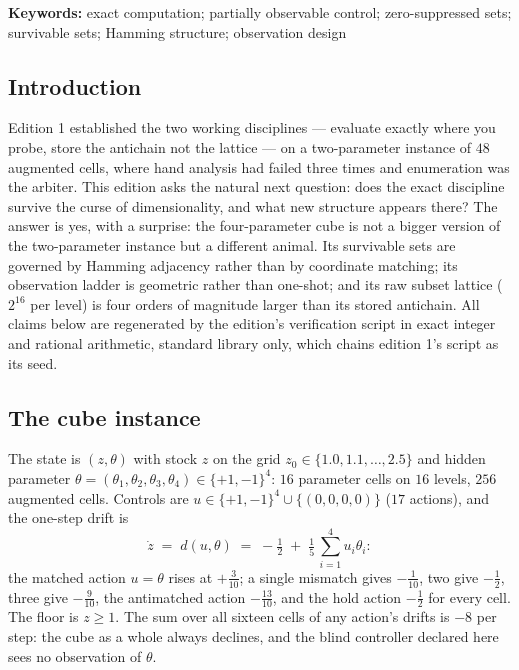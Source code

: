 \documentclass[10pt,twocolumn]{article}
\theoremstyle{plain}
\theoremstyle{definition}
\theoremstyle{remark}
\begin{document}
\textbf{Keywords:} exact computation; partially observable control;
zero-suppressed sets; survivable sets; Hamming structure; observation
design

\subsection{Introduction}\label{introduction}

Edition 1 established the two working disciplines --- evaluate exactly
where you probe, store the antichain not the lattice --- on a
two-parameter instance of \(48\) augmented cells, where hand analysis
had failed three times and enumeration was the arbiter. This edition
asks the natural next question: does the exact discipline survive the
curse of dimensionality, and what new structure appears there? The
answer is yes, with a surprise: the four-parameter cube is not a
bigger version of the two-parameter instance but a different animal.
Its survivable sets are governed by Hamming adjacency rather than by
coordinate matching; its observation ladder is geometric rather than
one-shot; and its raw subset lattice (\(2^{16}\) per level) is four
orders of magnitude larger than its stored antichain. All claims below
are regenerated by the edition's verification script in exact integer
and rational arithmetic, standard library only, which chains edition
1's script as its seed.

\subsection{The cube instance}\label{instance}

The state is \((z, \theta)\) with stock \(z\) on the grid
\(z_{0} \in \{1.0, 1.1, \dots, 2.5\}\) and hidden parameter
\(\theta = (\theta_{1}, \theta_{2}, \theta_{3}, \theta_{4}) \in
\{+1, -1\}^{4}\): \(16\) parameter cells on \(16\) levels, \(256\)
augmented cells. Controls are \(u \in \{+1,-1\}^{4} \cup \{(0,0,0,0)\}\)
(\(17\) actions), and the one-step drift is
\[
\dot z \;=\; d(u, \theta) \;=\; -\tfrac12
\;+\; \tfrac15\,\textstyle\sum_{i=1}^{4} u_{i}\theta_{i}:
\]
the matched action \(u = \theta\) rises at \(+\tfrac3{10}\); a single
mismatch gives \(-\tfrac1{10}\), two give \(-\tfrac12\), three give
\(-\tfrac9{10}\), the antimatched action \(-\tfrac{13}{10}\), and the
hold action \(-\tfrac12\) for every cell. The floor is \(z \ge 1\).
The sum over all sixteen cells of any action's drifts is \(-8\) per
step: the cube as a whole always declines, and the blind controller
declared here sees no observation of \(\theta\).
\end{document}

